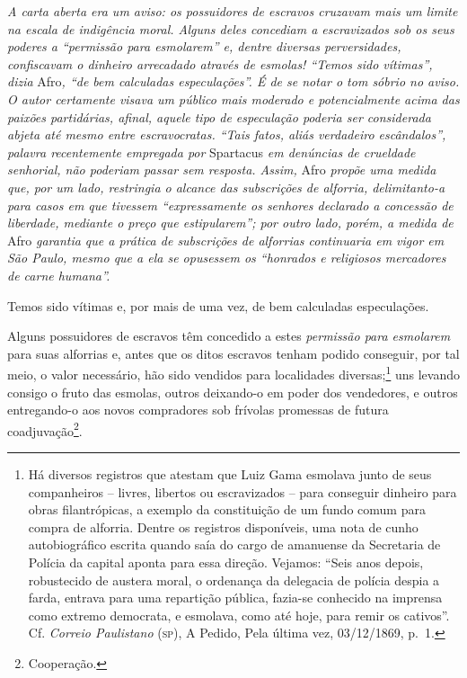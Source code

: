 \begin{didascalia}
\emph{A carta aberta era um aviso: os possuidores de escravos cruzavam
mais um limite na escala de indigência moral. Alguns deles concediam a
escravizados sob os seus poderes a ``permissão para esmolarem'' e, dentre
diversas perversidades, confiscavam o dinheiro arrecadado através de
esmolas! ``Temos sido vítimas'', dizia} Afro\emph{, ``de bem calculadas
especulações''. É de se notar o tom sóbrio no aviso. O autor certamente
visava um público mais moderado e potencialmente acima das paixões
partidárias, afinal, aquele tipo de especulação poderia ser considerada
abjeta até mesmo entre escravocratas. ``Tais fatos, aliás verdadeiro
escândalos'', palavra recentemente empregada por} Spartacus \emph{em
denúncias de crueldade senhorial, não poderiam passar sem resposta.
Assim,} Afro \emph{propõe uma medida que, por um lado, restringia o
alcance das subscrições de alforria, delimitanto-a para casos em que
tivessem ``expressamente os senhores declarado a concessão de liberdade,
mediante o preço que estipularem''; por outro lado, porém, a medida de}
Afro \emph{garantia que a prática de subscrições de alforrias
continuaria em vigor em São Paulo, mesmo que a ela se opusessem os
``honrados e religiosos mercadores de carne humana''.}
\end{didascalia}


Temos sido vítimas e, por mais de uma vez, de bem calculadas
especulações.

Alguns possuidores de escravos têm concedido a estes \emph{permissão
para esmolarem} para suas alforrias e, antes que os ditos escravos
tenham podido conseguir, por tal meio, o valor necessário, hão sido
vendidos para localidades diversas;\footnote{ Há diversos registros que
  atestam que Luiz Gama esmolava junto de seus companheiros -- livres,
  libertos ou escravizados -- para conseguir dinheiro para obras
  filantrópicas, a exemplo da constituição de um fundo comum para compra
  de alforria. Dentre os registros disponíveis, uma nota de cunho
  autobiográfico escrita quando saía do cargo de amanuense da Secretaria
  de Polícia da capital aponta para essa direção. Vejamos: ``Seis anos
  depois, robustecido de austera moral, o ordenança da delegacia de
  polícia despia a farda, entrava para uma repartição pública, fazia-se
  conhecido na imprensa como extremo democrata, e esmolava, como até
  hoje, para remir os cativos''. Cf. \emph{Correio Paulistano} (\textsc{sp}), A
  Pedido, Pela última vez, 03/12/1869, p.~1.} uns levando consigo o
fruto das esmolas, outros deixando-o em poder dos vendedores, e outros
entregando-o aos novos compradores sob frívolas promessas de futura
coadjuvação\footnote{ Cooperação.}.

